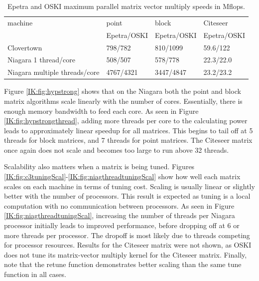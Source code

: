 \begin{table}[htbp]
\begin{center}
\begin{tabular}{|l|l|l|l|}
\hline
machine & point & block & Citeseer \\
 & Epetra/OSKI & Epetra/OSKI & Epetra/OSKI \\
\hline
Clovertown &  798/782 & 810/1099 & 59.6/122  \\
Niagara 1 thread/core & 508/507 & 578/778 & 22.3/22.0\\
Niagara multiple threads/core & 4767/4321 & 3447/4847 & 23.2/23.2 \\
\hline
\end{tabular}
\caption{Epetra and OSKI maximum parallel matrix vector multiply speeds in Mflops.}
\label{IK:fig:parrallelnums}
\end{center}
\end{table}


Figure \ref{IK:fig:hypstrong} shows that on the Niagara both the point and block matrix algorithms scale linearly with the number 
of cores.  Essentially, there is enough memory bandwidth to feed each core.  As seen in Figure \ref{IK:fig:hypstrongthread},
 adding more threads per core to the calculating power leads to approximately linear speedup for all matrices.
This begins to tail off at 5 threads for block matrices, and 7 threads for point matrices.  The Citeseer matrix once
again does not scale and becomes too large to run above 32 threads.

Scalability also matters when a matrix is being tuned.  Figures
\ref{IK:fig:c3tuningScal}-\ref{IK:fig:niagthreadtuningScal} show
how well each matrix scales on each machine in terms of tuning cost.  Scaling is usually
linear or slightly better with the number of processors.  This result is expected as tuning is
a local computation with no communication between processors.  As seen in Figure \ref{IK:fig:niagthreadtuningScal},
increasing
the number of threads per Niagara processor initially leads to improved performance, before dropping off at 6
or  more threads per processor. 
The dropoff is most likely due to threads competing for processor resources.  Results for the Citeseer matrix were
not shown, as OSKI does not tune its matrix-vector multiply kernel for the Citeseer matrix.  Finally, note
that the retune function demonstrates better scaling than the same tune function in all cases.

